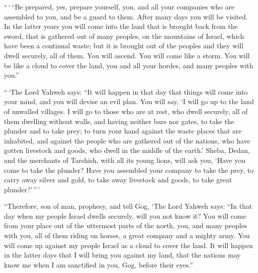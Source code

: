  ``\,`\,``Be prepared, yes, prepare yourself, you, and all
your companies who are assembled to you, and be a guard to them.
 After many days you will be visited. In the latter years
you will come into the land that is brought back from the sword, that is
gathered out of many peoples, on the mountains of Israel, which have
been a continual waste; but it is brought out of the peoples and they
will dwell securely, all of them.  You will ascend. You
will come like a storm. You will be like a cloud to cover the land, you
and all your hordes, and many peoples with you.''

 ``\,`The Lord Yahweh says: ``It will happen in that day
that things will come into your mind, and you will devise an evil plan.
 You will say, `I will go up to the land of unwalled
villages. I will go to those who are at rest, who dwell securely, all of
them dwelling without walls, and having neither bars nor gates,
 to take the plunder and to take prey; to turn your hand
against the waste places that are inhabited, and against the people who
are gathered out of the nations, who have gotten livestock and goods,
who dwell in the middle of the earth.'  Sheba, Dedan, and
the merchants of Tarshish, with all its young lions, will ask you, `Have
you come to take the plunder? Have you assembled your company to take
the prey, to carry away silver and gold, to take away livestock and
goods, to take great plunder?'\,''\,'

 ``Therefore, son of man, prophesy, and tell Gog, `The
Lord Yahweh says: ``In that day when my people Israel dwells securely,
will you not know it?  You will come from your place out
of the uttermost parts of the north, you, and many peoples with you, all
of them riding on horses, a great company and a mighty army.
 You will come up against my people Israel as a cloud to
cover the land. It will happen in the latter days that I will bring you
against my land, that the nations may know me when I am sanctified in
you, Gog, before their eyes.''

